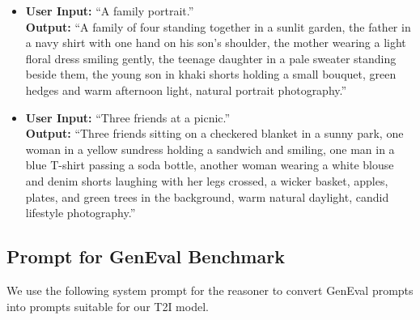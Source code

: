 \begin{tcolorbox}
\begin{itemize}[leftmargin=1.5em, itemsep=0.3em, topsep=0.2em, parsep=0pt, partopsep=0pt]
    \item \textbf{User Input:} ``A family portrait.''\\
    \textbf{Output:} ``A family of four standing together in a sunlit garden, the father in a navy shirt with one hand on his son's shoulder, the mother wearing a light floral dress smiling gently, the teenage daughter in a pale sweater standing beside them, the young son in khaki shorts holding a small bouquet, green hedges and warm afternoon light, natural portrait photography.''

    \item \textbf{User Input:} ``Three friends at a picnic.''\\
    \textbf{Output:} ``Three friends sitting on a checkered blanket in a sunny park, one woman in a yellow sundress holding a sandwich and smiling, one man in a blue T-shirt passing a soda bottle, another woman wearing a white blouse and denim shorts laughing with her legs crossed, a wicker basket, apples, plates, and green trees in the background, warm natural daylight, candid lifestyle photography.''

\end{itemize}

\end{tcolorbox}


\subsection{Prompt for GenEval Benchmark}
\label{sec:prompt-geneval}
We use the following system prompt for the reasoner to convert GenEval prompts into prompts suitable for our T2I model.

